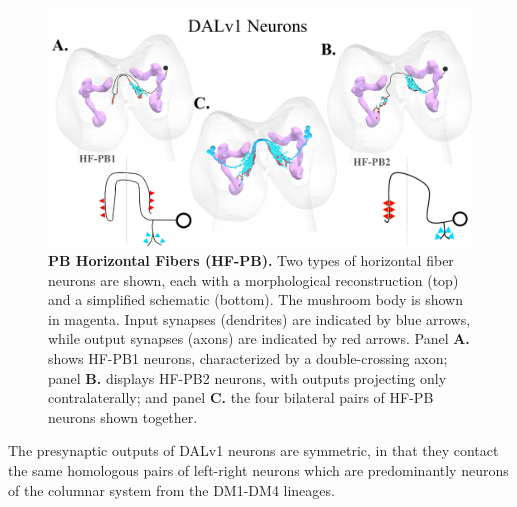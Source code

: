     \begin{figure}
        \centering
        \includegraphics[width=12cm]{Figs/CX/DALV1s.pdf}
        \caption[PB Dalv1 Neurons]{\textbf{PB Horizontal Fibers (HF-PB).} Two types of horizontal fiber neurons are shown, each with a morphological reconstruction (top) and a simplified schematic (bottom). The mushroom body is shown in magenta. Input synapses (dendrites) are indicated by blue arrows, while output synapses (axons) are indicated by red arrows. Panel \textbf{A.} shows HF-PB1 neurons, characterized by a double-crossing axon; panel \textbf{B.} displays HF-PB2 neurons, with outputs projecting only contralaterally; and panel \textbf{C.} the four bilateral pairs of HF-PB neurons shown together.}
        \label{DALv1s}
    \end{figure}


    The presynaptic outputs of DALv1 neurons are symmetric, in that they contact the same homologous pairs of left-right neurons which are predominantly neurons of the columnar system from the DM1-DM4 lineages.%


